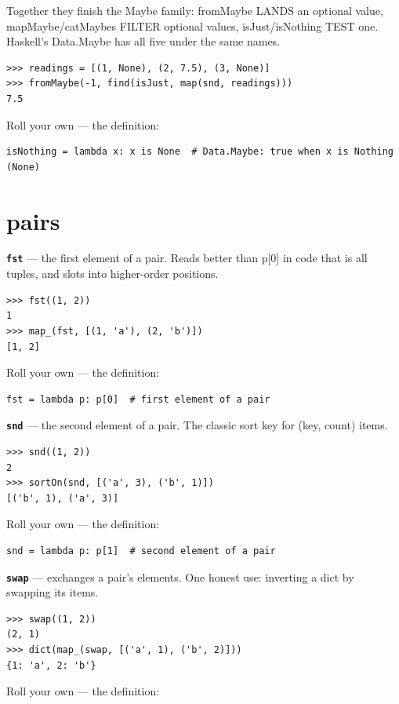 \documentclass[10pt,letterpaper]{article}
\begin{document}
Together they finish the Maybe family: fromMaybe LANDS an optional value, mapMaybe/catMaybes FILTER optional values, isJust/isNothing TEST one. Haskell's Data.Maybe has all five under the same names.

\begin{lstlisting}[style=ex]
>>> readings = [(1, None), (2, 7.5), (3, None)]
>>> fromMaybe(-1, find(isJust, map(snd, readings)))
7.5
\end{lstlisting}

Roll your own --- the definition:

\begin{lstlisting}[style=ex]
isNothing = lambda x: x is None  # Data.Maybe: true when x is Nothing (None)
\end{lstlisting}

\section{pairs}
\textbf{\texttt{fst}} --- the first element of a pair. Reads better than p[0] in code that is all tuples, and slots into higher-order positions.
\begin{lstlisting}[style=ex]
>>> fst((1, 2))
1
>>> map_(fst, [(1, 'a'), (2, 'b')])
[1, 2]
\end{lstlisting}

Roll your own --- the definition:

\begin{lstlisting}[style=ex]
fst = lambda p: p[0]  # first element of a pair
\end{lstlisting}
\textbf{\texttt{snd}} --- the second element of a pair. The classic sort key for (key, count) items.
\begin{lstlisting}[style=ex]
>>> snd((1, 2))
2
>>> sortOn(snd, [('a', 3), ('b', 1)])
[('b', 1), ('a', 3)]
\end{lstlisting}

Roll your own --- the definition:

\begin{lstlisting}[style=ex]
snd = lambda p: p[1]  # second element of a pair
\end{lstlisting}
\textbf{\texttt{swap}} --- exchanges a pair's elements. One honest use: inverting a dict by swapping its items.
\begin{lstlisting}[style=ex]
>>> swap((1, 2))
(2, 1)
>>> dict(map_(swap, [('a', 1), ('b', 2)]))
{1: 'a', 2: 'b'}
\end{lstlisting}

Roll your own --- the definition:
\end{document}
